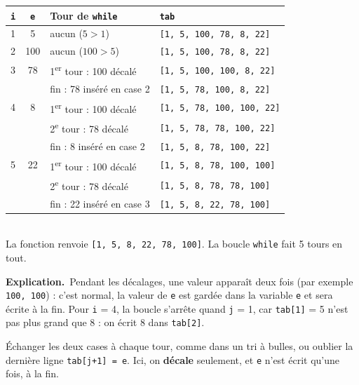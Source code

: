 \documentclass[11pt, a4paper]{exam}
\newcommand{\code}[1]{\texttt{#1}}
\newcommand{\explication}{\noindent\textbf{Explication.}\ }
\begin{document}
\begin{reponse}
\begin{tabular}{|c|c|l|l|}\hline
\code{i} & \code{e} & Tour de \code{while} & \code{tab} \\\hline
1 & 5 & aucun ($5 > 1$) & \code{[1, 5, 100, 78, 8, 22]} \\\hline
2 & 100 & aucun ($100 > 5$) & \code{[1, 5, 100, 78, 8, 22]} \\\hline
3 & 78 & 1\textsuperscript{er} tour : 100 décalé & \code{[1, 5, 100, 100, 8, 22]} \\
  &    & fin : 78 inséré en case 2 & \code{[1, 5, 78, 100, 8, 22]} \\\hline
4 & 8 & 1\textsuperscript{er} tour : 100 décalé & \code{[1, 5, 78, 100, 100, 22]} \\
  &   & 2\textsuperscript{e} tour : 78 décalé & \code{[1, 5, 78, 78, 100, 22]} \\
  &   & fin : 8 inséré en case 2 & \code{[1, 5, 8, 78, 100, 22]} \\\hline
5 & 22 & 1\textsuperscript{er} tour : 100 décalé & \code{[1, 5, 8, 78, 100, 100]} \\
  &    & 2\textsuperscript{e} tour : 78 décalé & \code{[1, 5, 8, 78, 78, 100]} \\
  &    & fin : 22 inséré en case 3 & \code{[1, 5, 8, 22, 78, 100]} \\\hline
\end{tabular}\\[0.3em]
La fonction renvoie \code{[1, 5, 8, 22, 78, 100]}. La boucle \code{while} fait 5 tours en tout.
\end{reponse}
\explication Pendant les décalages, une valeur apparaît deux fois (par exemple \code{100, 100}) : c'est normal, la valeur de \code{e} est gardée dans la variable \code{e} et sera écrite à la fin. Pour \code{i} = 4, la boucle s'arrête quand \code{j} = 1, car \code{tab[1]} = 5 n'est pas plus grand que 8 : on écrit 8 dans \code{tab[2]}.

\begin{erreur}
Échanger les deux cases à chaque tour, comme dans un tri à bulles, ou oublier la dernière ligne \code{tab[j+1] = e}. Ici, on \textbf{décale} seulement, et \code{e} n'est écrit qu'une fois, à la fin.
\end{erreur}
\end{document}

